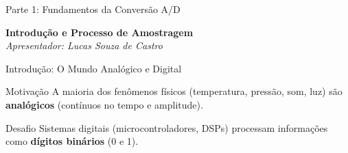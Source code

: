 \documentclass{beamer}
\begin{document}

\begin{frame}{Parte 1: Fundamentos da Conversão A/D}
    \begin{center}
        \Large{\textbf{Introdução e Processo de Amostragem}} \\
        \vspace{0.5cm}
        \textit{Apresentador: Lucas Souza de Castro}
    \end{center}
\end{frame}

\begin{frame}{Introdução: O Mundo Analógico e Digital}
    \begin{block}{Motivação}
        A maioria dos fenômenos físicos (temperatura, pressão, som, luz) são \textbf{analógicos} (contínuos no tempo e amplitude).
    \end{block}
    \begin{block}{Desafio}
        Sistemas digitais (microcontroladores, DSPs) processam informações como \textbf{dígitos binários} (0 e 1).
    \end{block}
    \begin{center}
    \end{center}
    \vspace{0.3cm}
    \begin{figure}
        \centering
    \end{figure}
\end{frame}
\end{document}
